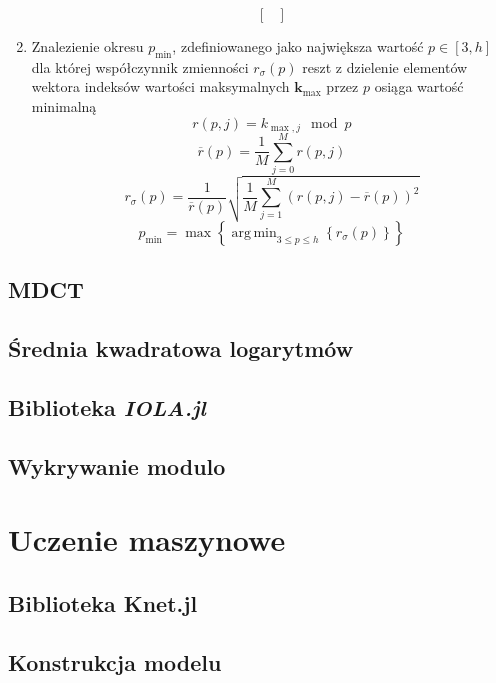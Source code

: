 \documentclass[pl,12pt]{aghdpl}
\DeclareMathOperator*{\argmin}{arg\,min}
\let\Oldsection\section%
\renewcommand{\section}{\FloatBarrier\Oldsection}
\let\Oldsubsection\subsection%
\renewcommand{\subsection}{\FloatBarrier\Oldsubsection}
\begin{document}
\begin{enumerate}
\begin{equation}
\begin{bmatrix}
        \end{bmatrix}
      \end{equation}
    \item Znalezienie okresu $p_{\min}$, zdefiniowanego jako największa wartość
      $p \in [3, h]$ dla której współczynnik zmienności $r_{\sigma}(p)$ reszt z dzielenie
      elementów wektora indeksów wartości maksymalnych $\bm k_{\max}$ przez $p$
      osiąga wartość minimalną
      \begin{equation}
        r(p, j) = k_{\max, j}\mod p
      \end{equation}
      \begin{equation}
        \overline r(p) = \frac{1}{M}\sum_{j=0}^{M}r(p, j)
      \end{equation}
      \begin{equation}
        r_{\sigma}(p) = \frac{1}{\overline r(p)}\sqrt{\frac{1}{M}
        \sum_{j=1}^{M}\left(r(p, j) - \overline r(p)\right)^2}
      \end{equation}
      \begin{equation}
        p_{\min} = \max\left\{\argmin_{3 \leq p \leq h}
        \left\{r_{\sigma}(p)\right\}\right\}
      \end{equation}
\end{enumerate}
\subsection{MDCT}
\subsection{Średnia kwadratowa logarytmów}
\subsection{Biblioteka \textit{IOLA.jl}}
\subsection{Wykrywanie modulo}
\section{Uczenie maszynowe}
\subsection{Biblioteka Knet.jl}
\subsection{Konstrukcja modelu}
\end{document}
